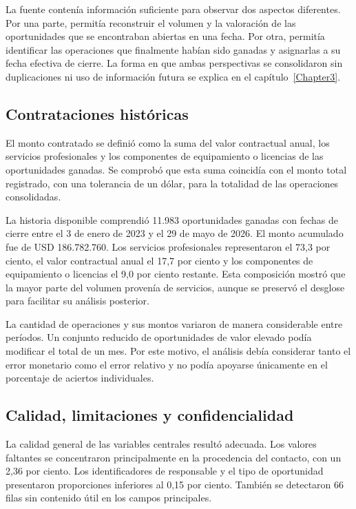 La fuente contenía información suficiente para observar dos aspectos diferentes. Por una parte, permitía reconstruir el volumen y la valoración de las oportunidades que se encontraban abiertas en una fecha. Por otra, permitía identificar las operaciones que finalmente habían sido ganadas y asignarlas a su fecha efectiva de cierre. La forma en que ambas perspectivas se consolidaron sin duplicaciones ni uso de información futura se explica en el capítulo~\ref{Chapter3}.

\subsection{Contrataciones históricas}

El monto contratado se definió como la suma del valor contractual anual, los servicios profesionales y los componentes de equipamiento o licencias de las oportunidades ganadas. Se comprobó que esta suma coincidía con el monto total registrado, con una tolerancia de un dólar, para la totalidad de las operaciones consolidadas.

La historia disponible comprendió 11.983 oportunidades ganadas con fechas de cierre entre el 3 de enero de 2023 y el 29 de mayo de 2026. El monto acumulado fue de USD 186.782.760. Los servicios profesionales representaron el 73,3 por ciento, el valor contractual anual el 17,7 por ciento y los componentes de equipamiento o licencias el 9,0 por ciento restante. Esta composición mostró que la mayor parte del volumen provenía de servicios, aunque se preservó el desglose para facilitar su análisis posterior.

La cantidad de operaciones y sus montos variaron de manera considerable entre períodos. Un conjunto reducido de oportunidades de valor elevado podía modificar el total de un mes. Por este motivo, el análisis debía considerar tanto el error monetario como el error relativo y no podía apoyarse únicamente en el porcentaje de aciertos individuales.

\subsection{Calidad, limitaciones y confidencialidad}

La calidad general de las variables centrales resultó adecuada. Los valores faltantes se concentraron principalmente en la procedencia del contacto, con un 2,36 por ciento. Los identificadores de responsable y el tipo de oportunidad presentaron proporciones inferiores al 0,15 por ciento. También se detectaron 66 filas sin contenido útil en los campos principales.

